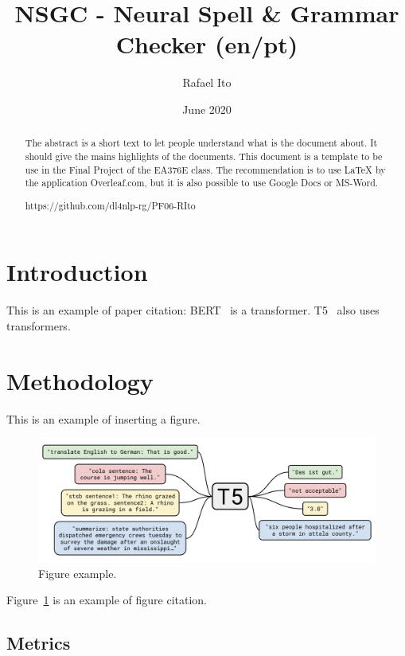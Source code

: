 \documentclass{article}
\title{NSGC - Neural Spell \& Grammar Checker (en/pt)}
\author{Rafael Ito}
\date{June 2020}
\begin{document}
\maketitle

\begin{abstract}
    The abstract is a short text to let people understand what is the document about.
    It should give the mains highlights of the documents.
    This document is a template to be use in the Final Project of the EA376E class.
    The recommendation is to use LaTeX by the application Overleaf.com, but it is also
    possible to use Google Docs or MS-Word.



https://github.com/dl4nlp-rg/PF06-RIto

\end{abstract}

\section{Introduction}

This is an example of paper citation: BERT~\cite{devlin2018bert} is a transformer. T5~\cite{raffel2019exploring} also uses transformers.

\section{Methodology} 

This is an example of inserting a figure. 

\begin{figure}[ht]
\centering
\includegraphics[width=.77\textwidth]{t5.png}
\caption{\label{fig:t5}Figure example.}
\end{figure}

Figure~\ref{fig:t5} is an example of figure citation.

\subsection{Metrics}
\end{document}
